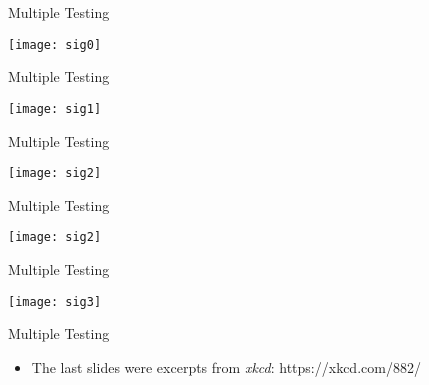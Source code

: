 \documentclass[xcolor=dvipsnames]{beamer}
\begin{document}
\begin{frame}{Multiple Testing}
\begin{center}
	\texttt{[image: sig0]}
\end{center}
\end{frame}

\begin{frame}{Multiple Testing}
	\begin{center}
		\texttt{[image: sig1]}
	\end{center}
\end{frame}

\begin{frame}{Multiple Testing}
\begin{center}
	\texttt{[image: sig2]}
\end{center}
\end{frame}

\begin{frame}{Multiple Testing}
\begin{center}
	\texttt{[image: sig2]}
\end{center}
\end{frame}

\begin{frame}{Multiple Testing}
\begin{center}
	\texttt{[image: sig3]}
\end{center}
\end{frame}

\begin{frame}{Multiple Testing}
\begin{itemize}
	\item The last slides were excerpts from \emph{xkcd}: https://xkcd.com/882/
\end{itemize}
\end{frame}
\end{document}
